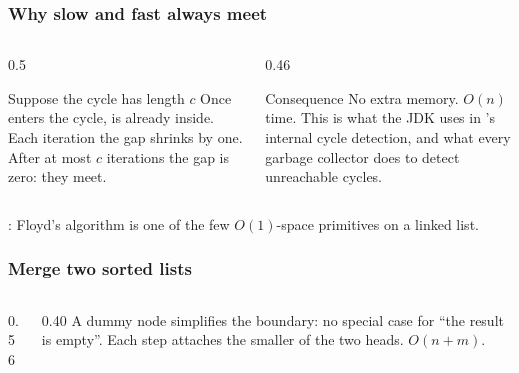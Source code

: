 \documentclass[aspectratio=169,10pt,compress]{beamer}
\begin{document}
\begin{frame}[t,fragile] \frametitle{Why slow and fast always meet}
  \begin{columns}[T]
    \begin{column}{0.5\textwidth}
      \begin{block}{Suppose the cycle has length $c$}
        \small
        Once  enters the cycle,  is already
        inside. Each iteration the gap shrinks by one. After at most
        $c$ iterations the gap is zero: they meet.
      \end{block}
    \end{column}
    \begin{column}{0.46\textwidth}
      \begin{block}{Consequence}
        \small
        No extra memory. $O(n)$ time. This is what the JDK uses in
        's internal cycle detection, and what every
        garbage collector does to detect unreachable cycles.
      \end{block}
    \end{column}
  \end{columns}
  \vspace{0.4em}
  \small
  : Floyd's algorithm is one
  of the few $O(1)$-space primitives on a linked list.
\end{frame}




\begin{frame}[t,fragile] \frametitle{Merge two sorted lists}
  \begin{columns}[T]
    \begin{column}{0.56\textwidth}
    \end{column}
    \begin{column}{0.40\textwidth}
      \small
      A dummy node simplifies the boundary: no special case for ``the
      result is empty''. Each step attaches the smaller of the two
      heads. $O(n + m)$.
    \end{column}
  \end{columns}
\end{frame}
\end{document}
